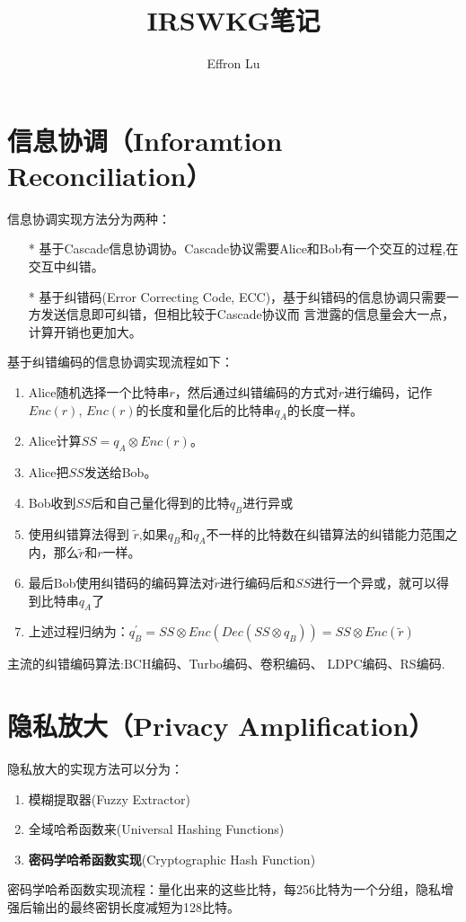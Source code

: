 \documentclass[geye,green,normal,cn,founder]{elegantnote}
\title{IRSWKG笔记}
\author{Effron Lu}
\institute{SEU}
\date{\zhdate{2021/02/07}}
\begin{document}
\maketitle
\section{信息协调（Inforamtion Reconciliation）}
信息协调实现方法分为两种：
\begin{enumerate}
    \item[*] 基于Cascade信息协调协。Cascade协议需要Alice和Bob有一个交互的过程,在交互中纠错。
    \item[*] 基于纠错码(Error Correcting Code, ECC)，基于纠错码的信息协调只需要一方发送信息即可纠错，但相比较于Cascade协议而 言泄露的信息量会大一点，计算开销也更加大。 
\end{enumerate}

基于纠错编码的信息协调实现流程如下：

\begin{enumerate}
    \item Alice随机选择一个比特串$r$，然后通过纠错编码的方式对$r$进行编码，记作$Enc(r)$, $Enc(r)$的长度和量化后的比特串$q_A$的长度一样。 
    \item Alice计算$SS = q_A \otimes Enc(r)$。 
    \item Alice把$SS$发送给Bob。 
    \item Bob收到$SS$后和自己量化得到的比特$q_B$进行异或
    \item 使用纠错算法得到 $\tilde{r}$,如果$q_B$和$q_A$不一样的比特数在纠错算法的纠错能力范围之内，那么$\tilde{r}$和$r$一样。
    \item 最后Bob使用纠错码的编码算法对$\tilde{r}$进行编码后和$SS$进行一个异或，就可以得到比特串$q_A$了
    \item 上述过程归纳为：$q_B^{\prime} = SS \otimes Enc(Dec(SS \otimes q_B)) = SS \otimes Enc(\tilde{r})$
\end{enumerate}

主流的纠错编码算法:BCH编码、Turbo编码、卷积编码、 LDPC编码、RS编码.
\section{隐私放大（Privacy Amplification）}
隐私放大的实现方法可以分为：
\begin{enumerate}
    \item 模糊提取器(Fuzzy Extractor)
    \item 全域哈希函数来(Universal Hashing Functions)
    \item \textbf{密码学哈希函数实现}(Cryptographic Hash Function)
\end{enumerate}

密码学哈希函数实现流程：量化出来的这些比特，每256比特为一个分组，隐私增强后输出的最终密钥⻓度减短为128比特。
  
\end{document}
